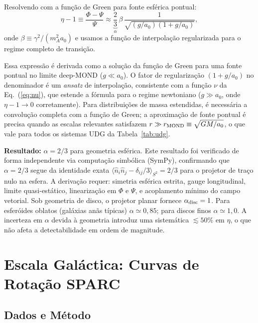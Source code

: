 \documentclass[aps,prd,twocolumn,showpacs,superscriptaddress]{revtex4-2}
\newcommand{\aO}{a_0}
\begin{document}
Resolvendo com a função de Green para fonte esférica pontual:
\begin{equation}
  \eta - 1 \equiv \frac{\Phi-\Psi}{\Psi}
  \approx \underbrace{\frac{2}{3}}_{\alpha}\,\beta\,
  \frac{1}{\sqrt{(g/\aO)(1+g/\aO)}},
  \label{eq:eta}
\end{equation}
onde $\beta \equiv \gamma^2/(m_A^2\aO)$ e usamos a função de
interpolação regularizada para o regime completo de transição.

Essa expressão é derivada como a solução da função de Green para
uma fonte pontual no limite deep-MOND ($g \ll \aO$).
O fator de regularização $(1 + g/\aO)$ no denominador é um
\textit{ansatz} de interpolação, consistente com a função $\nu$
da Eq.~(\ref{eq:nu}), que estende a fórmula para o regime
newtoniano ($g \gg \aO$, onde $\eta - 1 \to 0$ corretamente).
Para distribuições de massa estendidas, é necessária a convolução
completa com a função de Green; a aproximação de fonte pontual é
precisa quando as escalas relevantes satisfazem
$r \gg r_{\rm MOND} \equiv \sqrt{GM/\aO}$, o que vale para
todos os sistemas UDG da Tabela~\ref{tab:udg}.

\textbf{Resultado:} $\alpha = 2/3$ para geometria esférica.
Este resultado foi verificado de forma independente via computação
simbólica (SymPy), confirmando que $\alpha = 2/3$ segue da
identidade exata $\langle \hat{n}_i\hat{n}_j - \delta_{ij}/3
\rangle_{S^2} = 2/3$ para o projetor de traço nulo na esfera.
A derivação requer: simetria esférica estrita, gauge longitudinal,
limite quasi-estático, linearização em $\Phi$ e $\Psi$, e
acoplamento mínimo do campo vetorial.
Sob geometria de disco, o projetor planar fornece $\alpha_{\rm disc} = 1$.
Para esferóides oblatos (galáxias anãs típicas) $\alpha \simeq 0{,}85$;
para discos finos $\alpha \simeq 1{,}0$.
A incerteza em $\alpha$ devida à geometria introduz uma sistemática
$\lesssim 50\%$ em $\eta$, o que não afeta a detectabilidade em
ordem de magnitude.

\section{Escala Galáctica: Curvas de Rotação SPARC}
\label{sec:sparc}

\subsection{Dados e Método}
\end{document}
